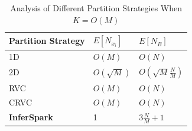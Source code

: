 \begin{table}[h]
	\centering
	\caption{Analysis of Different Partition Strategies When $K = O(M)$}
	\label{tab:max_v_per_edge_part_OM}
	\small
	\begin{tabular}{lll}
		\hline
		Partition Strategy & $E[N_{x_i}]$ & $E[N_B]$\\\hline\hline
		1D & $O(M)$ & $O(N)$ \\\hline
		2D & $O(\sqrt{M})$ & $O(\sqrt{M}\frac{N}{M})$ \\\hline
		RVC & $O(M)$ & $O(N)$ \\\hline
		CRVC & $O(M)$ & $O(N)$ \\\hline
		{\bf InferSpark} & 1 & $3\frac{N}{M}+1$ \\\hline
	\end{tabular}
\end{table}

